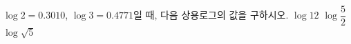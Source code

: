 $\log 2=0.3010$, $\log 3=0.4771$일 때, 다음 상용로그의 값을 구하시오.
 $\log 12$
 $\log\dfrac{5}{2}$
 $\log\sqrt{5}$
